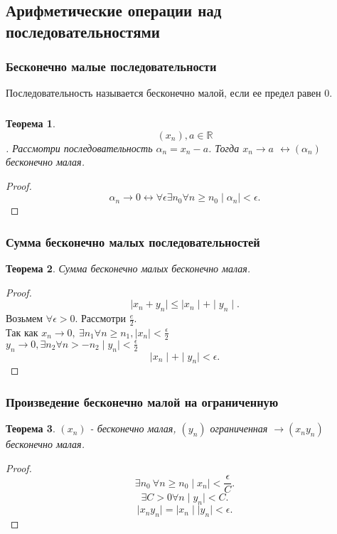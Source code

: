 \documentclass[a4paper]{scrartcl}
\newtheorem{theorem}{Теорема}
\begin{document}
\subsection{Арифметические операции над последовательностями}
\subsubsection{Бесконечно малые последовательности}
Последовательность называется бесконечно малой, если ее предел равен 0.
\subsubsection{}
\begin{theorem}
	$$(x_n) , a \in \mathbb{R}$$. Рассмотри последовательность $\alpha_n = x_n - a$. Тогда $x_n \to a$
	$\leftrightarrow (\alpha_n)$ бесконечно малая.
\end{theorem}
\begin{proof}
	\[
		\alpha_n \to 0 \leftrightarrow \forall  \epsilon \exists  n_0 \forall n \ge  n_0 \mid \alpha_n \mid <\epsilon
		.\]
\end{proof}
\subsubsection{Сумма бесконечно малых последовательностей}
\begin{theorem}
	Сумма бесконечно малых бесконечно малая.
\end{theorem}
\begin{proof}
	\[
		\mid x_n + y_n \mid \le \mid x_n \mid + \mid y_n \mid
		.\]
	Возьмем $\forall \epsilon > 0$. Рассмотри $\frac{e}{2}$.\\ Так как $x_n \to 0, ~ \exists n_1 \forall n
		\ge n_1 , \mid x_n \mid < \frac{\epsilon}{2}~$ \\
	$y_n \to 0 , \exists  n_2 \forall  n >- n_2 \mid y_n \mid < \frac{\epsilon}{2}$
	\[
		\mid x_n \mid + \mid y_n \mid < \epsilon
		.\]
\end{proof}
\subsubsection{Произведение бесконечно малой на ограниченную}
\begin{theorem}
	$(x_n)$ - бесконечно малая, $(y_n)$ ограниченная   $\rightarrow (x_{n}y_{n})$ бесконечно малая.
\end{theorem}
\begin{proof}
	\[
		\exists n_0 ~ \forall n \ge n_0 \mid x_n \mid < \frac{\epsilon}{C}
		.\]
	\[
		\exists C > 0 \forall n \mid y_n \mid < C
		.\]
	\[
		\mid x_n y_n \mid = \mid x_n \mid \mid y_n \mid < \epsilon
		.\]
\end{proof}
\end{document}
